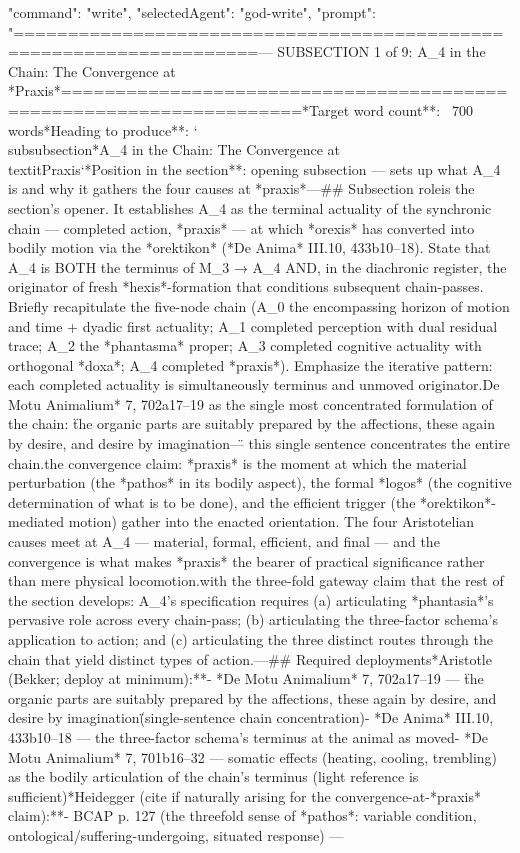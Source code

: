{
  "command": "write",
  "selectedAgent": "god-write",
  "prompt": "====================================================================\nDELTA — SUBSECTION 1 of 9: A_4 in the Chain: The Convergence at *Praxis*\n====================================================================\n\n**Target word count**: ~700 words\n**Heading to produce**: `\\subsubsection*{A_4 in the Chain: The Convergence at \\textit{Praxis}}`\n**Position in the section**: opening subsection — sets up what A_4 is and why it gathers the four causes at *praxis*\n\n---\n\n## Subsection role\n\nThis is the section's opener. It establishes A_4 as the terminal actuality of the synchronic chain — completed action, *praxis* — at which *orexis* has converted into bodily motion via the *orektikon* (*De Anima* III.10, 433b10–18). State that A_4 is BOTH the terminus of M_3 → A_4 AND, in the diachronic register, the originator of fresh *hexis*-formation that conditions subsequent chain-passes. Briefly recapitulate the five-node chain (A_0 the encompassing horizon of motion and time + dyadic first actuality; A_1 completed perception with dual residual trace; A_2 the *phantasma* proper; A_3 completed cognitive actuality with orthogonal *doxa*; A_4 completed *praxis*). Emphasize the iterative pattern: each completed actuality is simultaneously terminus and unmoved originator.\n\nDeploy *De Motu Animalium* 7, 702a17–19 as the single most concentrated formulation of the chain: \"the organic parts are suitably prepared by the affections, these again by desire, and desire by imagination\" — this single sentence concentrates the entire chain.\n\nDevelop the convergence claim: *praxis* is the moment at which the material perturbation (the *pathos* in its bodily aspect), the formal *logos* (the cognitive determination of what is to be done), and the efficient trigger (the *orektikon*-mediated motion) gather into the enacted orientation. The four Aristotelian causes meet at A_4 — material, formal, efficient, and final — and the convergence is what makes *praxis* the bearer of practical significance rather than mere physical locomotion.\n\nClose with the three-fold gateway claim that the rest of the section develops: A_4's specification requires (a) articulating *phantasia*'s pervasive role across every chain-pass; (b) articulating the three-factor schema's application to action; and (c) articulating the three distinct routes through the chain that yield distinct types of action.\n\n---\n\n## Required deployments\n\n**Aristotle (Bekker; deploy at minimum):**\n- *De Motu Animalium* 7, 702a17–19 — \"the organic parts are suitably prepared by the affections, these again by desire, and desire by imagination\" (single-sentence chain concentration)\n- *De Anima* III.10, 433b10–18 — the three-factor schema's terminus at the animal as moved\n- *De Motu Animalium* 7, 701b16–32 — somatic effects (heating, cooling, trembling) as the bodily articulation of the chain's terminus (light reference is sufficient)\n\n**Heidegger (cite if naturally arising for the convergence-at-*praxis* claim):**\n- BCAP p. 127 (the threefold sense of *pathos*: variable condition, ontological/suffering-undergoing, situated response) — }
